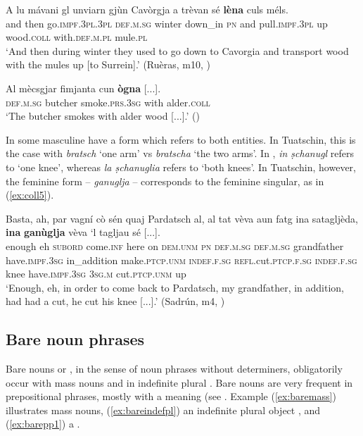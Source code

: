 \ea
\label{ex:coll3}
\gll  A lu mávani gl unviarn gjùn Cavòrgja a trèvan sé \textbf{lèna} culs méls.\\
and then go.\textsc{impf.3pl.3pl} \textsc{def.m.sg} winter down\_in \textsc{pn} and pull.\textsc{impf.3pl} up wood.\textsc{coll} with.\textsc{def.m.pl} mule.\textsc{pl} \\
\glt `And then during winter they used to go down to Cavorgia and transport wood with the mules up [to Surrein].' (Ruèras, m10, )
\z

\ea\label{ex:coll4}
\gll  Al mècsgjar fimjanta cun \textbf{ògna} [...].\\
\textsc{def.m.sg} butcher smoke.\textsc{prs.3sg} with alder.\textsc{coll} \\
\glt `The butcher smokes with alder wood [...].' ()
\z

In  some masculine  have a  form which refers to both entities.  In Tuatschin, this is the case with \textit{bratsch} `one arm' vs \textit{bratscha} `the two arms'. In , \textit{in ṣchanugl} refers to `one knee’, whereas \textit{la ṣchanuglia} refers to `both knees’.  In Tuatschin, however, the feminine form -- \textit{ganuglja} -- corresponds to the feminine singular, as in (\ref{ex:coll5}).

\ea
\label{ex:coll5}
\gll   Basta, ah, par vagní cò sén quaj Pardatsch al, al tat vèva aun fatg ina satagljèda, \textbf{ina} \textbf{ganùglja} vèva `l tagljau sé [...]. \\
enough eh \textsc{subord} come.\textsc{inf} here on \textsc{dem.unm} \textsc{pn} \textsc{def.m.sg} \textsc{def.m.sg} grandfather have.\textsc{impf.3sg} in\_addition make.\textsc{ptcp.unm} \textsc{indef.f.sg} \textsc{refl.}cut.\textsc{ptcp.f.sg} \textsc{indef.f.sg} knee have.\textsc{impf.3sg} \textsc{3sg.m} cut.\textsc{ptcp.unm} up\\
\glt `Enough, eh, in order to come back to Pardatsch, my grandfather, in addition, had had a cut, he cut his knee [...].' (Sadrún, m4, )
\z

\subsection{Bare noun phrases}\label{sec:3.1.4}
Bare nouns or , in the sense of noun phrases without determiners, obligatorily occur with mass nouns and in indefinite plural . Bare nouns are very frequent in prepositional phrases, mostly with a  meaning (see . Example (\ref{ex:baremass}) illustrates mass nouns, (\ref{ex:bareindefpl}) an indefinite plural object , and (\ref{ex:barepp1}) a .

